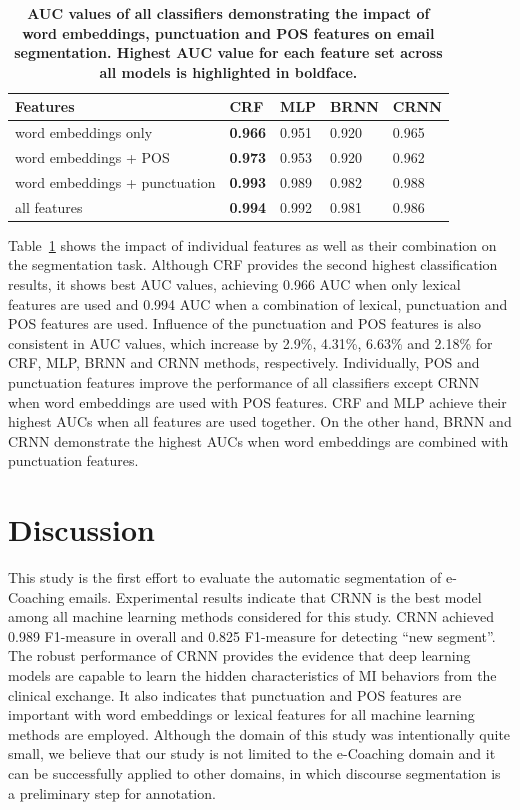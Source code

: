 \documentclass{amia}
\begin{document}
\begin{table}[ht]
\centering
\caption{\textbf{AUC values of all classifiers demonstrating the impact of word embeddings, punctuation and POS features on email segmentation. Highest AUC value for each feature set across all models is highlighted in boldface.}}
\label{tab:result_roc}
 \begin{tabular}{|l|l|l|l|l|}
  \hline
\textbf{Features} & \textbf{CRF} & \textbf{MLP}  & \textbf{BRNN} & \textbf{CRNN} \\ \hline      
 word embeddings only & \textbf{0.966} & 0.951 & 0.920 & 0.965 \\ \hline
 word embeddings + POS & \textbf{0.973} & 0.953 & 0.920 & 0.962 \\ \hline
 word embeddings + punctuation & \textbf{0.993} & 0.989 & 0.982 & 0.988 \\ \hline
 all features & \textbf{0.994} & 0.992 & 0.981 & 0.986 \\ \hline
  \end{tabular}
\end{table}      


Table~\ref{tab:result_roc} shows the impact of individual features as well as their combination on the segmentation task. Although CRF provides the second highest classification results, it shows best AUC values, achieving 0.966 AUC when only lexical features are used and 0.994 AUC when a combination of lexical, punctuation and POS features are used. Influence of the punctuation and POS features is also consistent in AUC values, which increase by 2.9\%, 4.31\%, 6.63\% and 2.18\% for CRF, MLP, BRNN and CRNN methods, respectively. Individually, POS and punctuation features improve the performance of all classifiers except CRNN when word embeddings are used with POS features. CRF and MLP achieve their highest AUCs when all features are used together. On the other hand, BRNN and CRNN demonstrate the highest AUCs when word embeddings are combined with punctuation features. 

\section*{Discussion}
This study is the first effort to evaluate the automatic segmentation of e-Coaching emails. Experimental results indicate that CRNN is the best model among all machine learning methods considered for this study. CRNN achieved 0.989 F1-measure in overall and 0.825 F1-measure for detecting ``new segment''. The robust performance of CRNN provides the evidence that deep learning models are capable to learn the hidden characteristics of MI behaviors from the clinical exchange. It also indicates that punctuation and POS features are important with word embeddings or lexical features for all machine learning methods are employed. Although the domain of this study was intentionally quite small, we believe that our study is not limited to the e-Coaching domain and it can be successfully applied to other domains, in which discourse segmentation is a preliminary step for annotation.
\end{document}
